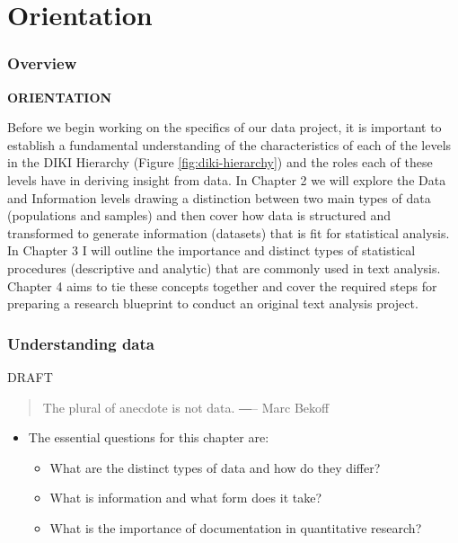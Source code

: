 \documentclass[
]{article}
\providecommand{\tightlist}{%
  \setlength{\itemsep}{0pt}\setlength{\parskip}{0pt}}
\newenvironment{rmdblock}[1]
  {\begin{shaded*}
  \begin{itemize}
  \renewcommand{\labelitemi}{
    \raisebox{-.5\height}[0pt][0pt]{
      {\setkeys{Gin}{width=2em,keepaspectratio}\texttt{[image: assets/images/\#1]}}
    }
  }
  \item
  }
  {
  \end{itemize}
  \end{shaded*}
  }
\newenvironment{rmdkey}
  {\begin{rmdblock}{key}}
  {\end{rmdblock}}
\begin{document}
\hypertarget{part-orientation}{%
\part{Orientation}\label{part-orientation}}

\hypertarget{orientation-overview}{%
\section*{Overview}\label{orientation-overview}}

\textbf{ORIENTATION}

Before we begin working on the specifics of our data project, it is important to establish a fundamental understanding of the characteristics of each of the levels in the DIKI Hierarchy (Figure \ref{fig:diki-hierarchy}) and the roles each of these levels have in deriving insight from data. In Chapter 2 we will explore the Data and Information levels drawing a distinction between two main types of data (populations and samples) and then cover how data is structured and transformed to generate information (datasets) that is fit for statistical analysis. In Chapter 3 I will outline the importance and distinct types of statistical procedures (descriptive and analytic) that are commonly used in text analysis. Chapter 4 aims to tie these concepts together and cover the required steps for preparing a research blueprint to conduct an original text analysis project.

\hypertarget{understanding-data}{%
\section{Understanding data}\label{understanding-data}}

DRAFT

\begin{quote}
The plural of anecdote is not data.
―-- Marc Bekoff
\end{quote}

\begin{rmdkey}
The essential questions for this chapter are:

\begin{itemize}
\tightlist
\item
  What are the distinct types of data and how do they differ?
\item
  What is information and what form does it take?
\item
  What is the importance of documentation in quantitative research?
\end{itemize}
\end{rmdkey}
\end{document}
